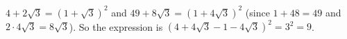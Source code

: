 $4+2\sqrt3=\left(1+\sqrt3\right)^2$ and $49+8\sqrt3=\left(1+4\sqrt3\right)^2$ (since $1+48=49$ and $2\cdot4\sqrt3=8\sqrt3$). So the expression is $\left(4+4\sqrt3-1-4\sqrt3\right)^2=3^2=\boxed{9}$.
